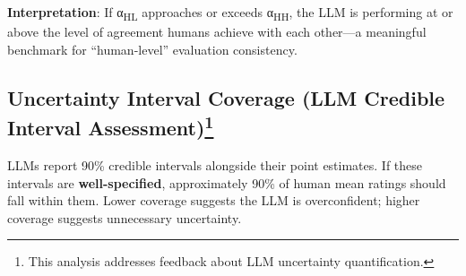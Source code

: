 \documentclass[
  11pt,
  letterpaper,
  DIV=11,
  numbers=noendperiod]{scrreprt}
\begin{document}
\textbf{Interpretation}: If α\textsubscript{HL} approaches or exceeds
α\textsubscript{HH}, the LLM is performing at or above the level of
agreement humans achieve with each other---a meaningful benchmark for
``human-level'' evaluation consistency.

\subsection[Uncertainty Interval Coverage (LLM Credible Interval
Assessment)]{\texorpdfstring{Uncertainty Interval Coverage (LLM Credible
Interval
Assessment)\footnote{This analysis addresses feedback about LLM
  uncertainty quantification.}}{Uncertainty Interval Coverage (LLM Credible Interval Assessment)}}\label{uncertainty-interval-coverage-llm-credible-interval-assessmentresults_ratings-3}

LLMs report 90\% credible intervals alongside their point estimates. If
these intervals are \textbf{well-specified}, approximately 90\% of human
mean ratings should fall within them. Lower coverage suggests the LLM is
overconfident; higher coverage suggests unnecessary uncertainty.
\end{document}
